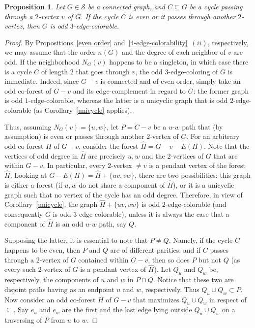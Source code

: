 \documentclass[a4paper,12pt]{article}
\newtheorem{proposition}[theorem]{Proposition}
\numberwithin{equation}{section}
\begin{document}
\begin{proposition}
    \label{sufficient condition 3-edge-colorability}
Let $G\in \mathcal{S}$ be a connected graph, and $C\subseteq G$ be a cycle passing through a $2$-vertex $v$ of $G$. If the cycle $C$ is even or it passes through another $2$-vertex, then $G$ is odd $3$-edge-colorable.
\end{proposition}
\begin{proof}
 By Propositions~\ref{even order} and~\ref{4-edge-colorability}~$(ii)$, respectively, we may assume that the order $n(G)$ and the degree of each neighbor of $v$ are odd. If the neighborhood $N_G(v)$ happens to be a singleton, in which case  there is a cycle $C$ of length $2$ that goes through $v$, the odd $3$-edge-coloring of $G$ is immediate. Indeed, since $G-v$ is connected and of even order, simply take an odd co-forest of $G-v$ and its edge-complement in regard to $G$: the former graph is odd $1$-edge-colorable, whereas the latter is a unicyclic graph that is odd $2$-edge-colorable (as Corollary~\ref{unicycle} applies).

Thus, assuming $N_G(v)=\{u,w\}$, let $P=C-v$ be a $u$-$w$ path that (by assumption) is even or passes through another $2$-vertex of $G$. For an arbitrary odd co-forest $H$ of $G-v$, consider the forest $\hat{H}=G-v-E(H)$. Note that the vertices of odd degree in $\hat{H}$ are precisely $u,w$ and the $2$-vertices of $G$ that are within $G-v$. In particular, every $2$-vertex $\neq v$ is a pendant vertex of the forest $\hat{H}$. Looking at $G-E(H)=\hat{H}+\{uv,vw\}$, there are two possibilities: this graph is either a forest (if $u,w$ do not share a component of $\hat{H}$), or it is a unicyclic graph such that no vertex of the cycle has an odd degree.  Therefore, in view of Corollary~\ref{unicycle}, the graph $\hat{H}+\{uv,vw\}$ is odd $2$-edge-colorable (and consequently $G$ is odd $3$-edge-colorable), unless it is always the case that a component of $\hat{H}$ is an odd $u$-$w$ path, say $Q$.

Supposing the latter, it is essential to note that $P\neq Q$. Namely, if the cycle $C$ happens to be even, then $P$ and $Q$ are of different parities; and if $C$ passes through a $2$-vertex of $G$ contained within $G-v$, then so does $P$ but not $Q$ (as every such $2$-vertex of $G$ is a pendant vertex of $\hat{H}$). Let $Q_u$ and $Q_w$ be, respectively, the components of $u$ and $w$ in $P\cap Q$. Notice that these two are disjoint paths having as an endpoint $u$ and $w$, respectively. Thus $Q_u\cup Q_w\subset P$. Now consider an odd co-forest $H$ of $G-v$ that maximizes $Q_u\cup Q_w$ in respect of $\subseteq$. Say $e_u$ and $e_w$ are the first and the last edge lying outside $Q_u\cup Q_w$ on a traversing of $P$ from $u$ to $w$.


\end{proof}
\end{document}

